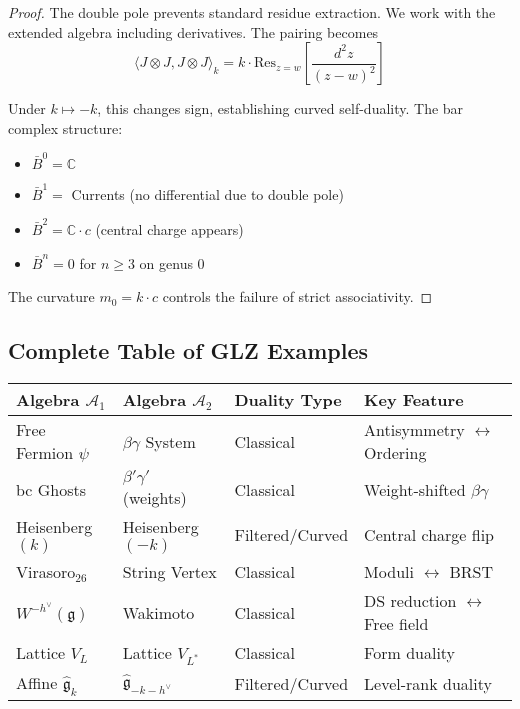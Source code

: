 \begin{proof}
The double pole prevents standard residue extraction. We work with the extended algebra including derivatives. The pairing becomes
\[
\langle J \otimes J, J \otimes J \rangle_k = k \cdot \text{Res}_{z=w}\left[\frac{d^2z}{(z-w)^2}\right]
\]
 
Under $k \mapsto -k$, this changes sign, establishing curved self-duality. The bar complex structure:
\begin{itemize}
\item $\bar{B}^0 = \mathbb{C}$
\item $\bar{B}^1 = $ Currents (no differential due to double pole)
\item $\bar{B}^2 = \mathbb{C} \cdot c$ (central charge appears)
\item $\bar{B}^n = 0$ for $n \geq 3$ on genus 0
\end{itemize}
The curvature $m_0 = k \cdot c$ controls the failure of strict associativity.
\end{proof}
 
\subsection{Complete Table of GLZ Examples}
 
\begin{center}
\begin{tabular}{|l|l|l|l|}
\hline
Algebra $\mathcal{A}_1$ & Algebra $\mathcal{A}_2$ & Duality Type & Key Feature \\
\hline
Free Fermion $\psi$ & $\beta\gamma$ System & Classical & Antisymmetry $\leftrightarrow$ Ordering \\
bc Ghosts & $\beta'\gamma'$ (weights) & Classical & Weight-shifted $\beta\gamma$ \\
Heisenberg$(k)$ & Heisenberg$(-k)$ & Filtered/Curved & Central charge flip \\
Virasoro$_{26}$ & String Vertex & Classical & Moduli $\leftrightarrow$ BRST \\
$W^{-h^\vee}(\mathfrak{g})$ & Wakimoto & Classical & DS reduction $\leftrightarrow$ Free field \\
Lattice $V_L$ & Lattice $V_{L^*}$ & Classical & Form duality \\
Affine $\hat{\mathfrak{g}}_k$ & $\hat{\mathfrak{g}}_{-k-h^\vee}$ & Filtered/Curved & Level-rank duality \\
\hline
\end{tabular}
\end{center}
 

